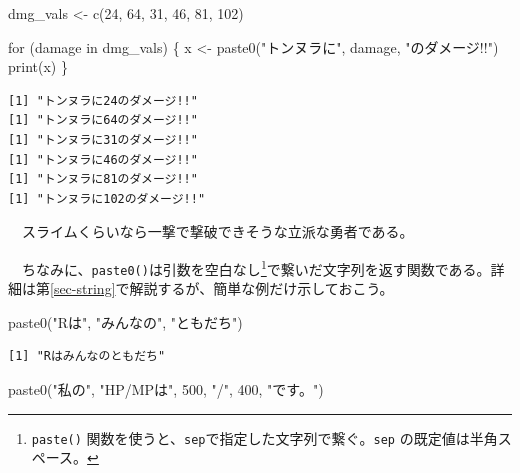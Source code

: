 \documentclass[
  a4paper,
  pandoc,
  ja=standard,
  jafont=haranoaji]{bxjsbook}
\newenvironment{Shaded}{\begin{snugshade}}{\end{snugshade}}
\newcommand{\ControlFlowTok}[1]{\textcolor[rgb]{0.00,0.48,0.65}{#1}}
\newcommand{\DecValTok}[1]{\textcolor[rgb]{0.68,0.00,0.00}{#1}}
\newcommand{\FunctionTok}[1]{\textcolor[rgb]{0.28,0.35,0.67}{#1}}
\newcommand{\NormalTok}[1]{\textcolor[rgb]{0.00,0.48,0.65}{#1}}
\newcommand{\OtherTok}[1]{\textcolor[rgb]{0.00,0.48,0.65}{#1}}
\newcommand{\StringTok}[1]{\textcolor[rgb]{0.13,0.47,0.30}{#1}}
\begin{document}
\begin{Shaded}
\begin{Highlighting}[numbers=left,,]
\NormalTok{dmg\_vals }\OtherTok{\textless{}{-}} \FunctionTok{c}\NormalTok{(}\DecValTok{24}\NormalTok{, }\DecValTok{64}\NormalTok{, }\DecValTok{31}\NormalTok{, }\DecValTok{46}\NormalTok{, }\DecValTok{81}\NormalTok{, }\DecValTok{102}\NormalTok{)}

\ControlFlowTok{for}\NormalTok{ (damage }\ControlFlowTok{in}\NormalTok{ dmg\_vals) \{}
\NormalTok{  x }\OtherTok{\textless{}{-}} \FunctionTok{paste0}\NormalTok{(}\StringTok{"トンヌラに"}\NormalTok{, damage, }\StringTok{"のダメージ!!"}\NormalTok{)}
  \FunctionTok{print}\NormalTok{(x)}
\NormalTok{\}}
\end{Highlighting}
\end{Shaded}

\begin{verbatim}
[1] "トンヌラに24のダメージ!!"
[1] "トンヌラに64のダメージ!!"
[1] "トンヌラに31のダメージ!!"
[1] "トンヌラに46のダメージ!!"
[1] "トンヌラに81のダメージ!!"
[1] "トンヌラに102のダメージ!!"
\end{verbatim}

　スライムくらいなら一撃で撃破できそうな立派な勇者である。

　ちなみに、\texttt{paste0()}は引数を空白なし\footnote{\texttt{paste()}
  関数を使うと、\texttt{sep}で指定した文字列で繋ぐ。\texttt{sep}
  の既定値は半角スペース。}で繋いだ文字列を返す関数である。詳細は第\ref{sec-string}で解説するが、簡単な例だけ示しておこう。

\begin{Shaded}
\begin{Highlighting}[numbers=left,,]
\FunctionTok{paste0}\NormalTok{(}\StringTok{"Rは"}\NormalTok{, }\StringTok{"みんなの"}\NormalTok{, }\StringTok{"ともだち"}\NormalTok{)}
\end{Highlighting}
\end{Shaded}

\begin{verbatim}
[1] "Rはみんなのともだち"
\end{verbatim}

\begin{Shaded}
\begin{Highlighting}[numbers=left,,]
\FunctionTok{paste0}\NormalTok{(}\StringTok{"私の"}\NormalTok{, }\StringTok{"HP/MPは"}\NormalTok{, }\DecValTok{500}\NormalTok{, }\StringTok{"/"}\NormalTok{, }\DecValTok{400}\NormalTok{, }\StringTok{"です。"}\NormalTok{)}
\end{Highlighting}
\end{Shaded}
\end{document}
